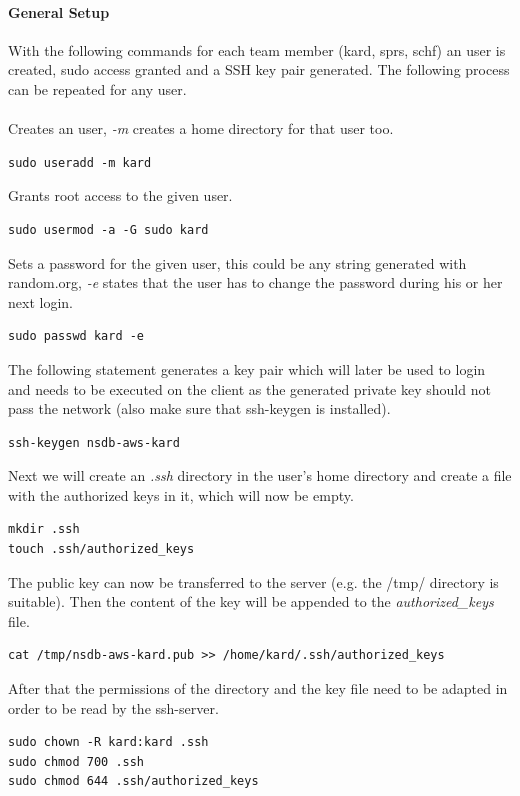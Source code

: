 \paragraph{General Setup}
With the following commands for each team member (kard, sprs, schf) an user is created, sudo access granted and a SSH key pair generated. The following process can be repeated for any user. 
\\\\
Creates an user, \textit{-m} creates a home directory for that user too.
\begin{lstlisting}
sudo useradd -m kard
\end{lstlisting}

Grants root access to the given user.
\begin{lstlisting}
sudo usermod -a -G sudo kard
\end{lstlisting}

Sets a password for the given user, this could be any string generated with random.org, \textit{-e} states that the user has to change the password during his or her next login.
\begin{lstlisting}
sudo passwd kard -e
\end{lstlisting}

The following statement generates a key pair which will later be used to login and needs to be executed on the client as the generated private key should not pass the network (also make sure that ssh-keygen is installed).
\begin{lstlisting}
ssh-keygen nsdb-aws-kard
\end{lstlisting}

Next we will create an \textit{.ssh} directory in the user's home directory and create a file with the authorized keys in it, which will now be empty.
\begin{lstlisting}
mkdir .ssh
touch .ssh/authorized_keys
\end{lstlisting}

The public key can now be transferred to the server (e.g. the /tmp/ directory is suitable). Then the content of the key will be appended to the \textit{authorized\_keys} file.
\begin{lstlisting}
cat /tmp/nsdb-aws-kard.pub >> /home/kard/.ssh/authorized_keys
\end{lstlisting}

After that the permissions of the directory and the key file need to be adapted in order to be read by the ssh-server.
\begin{lstlisting}
sudo chown -R kard:kard .ssh
sudo chmod 700 .ssh
sudo chmod 644 .ssh/authorized_keys
\end{lstlisting}

